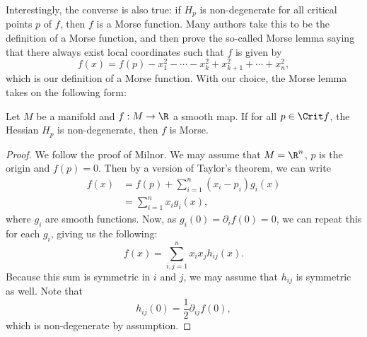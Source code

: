 Interestingly, the converse is also true: if $H_p$ is non-degenerate for all critical points  $p$ of $f$, then  $f$ is a Morse function.
Many authors take this to be the definition of a Morse function, and then prove the so-called Morse lemma saying that there always exist local coordinates such that $f$ is given by
\[
    f(x) = f(p) - x_1^2 - \cdots - x_k^2 + x_{k+1}^2 + \cdots + x_n^2
,\] 
which is our definition of a Morse function. 
With our choice, the Morse lemma takes on the following form:
\begin{lemma}
    Let $M$ be a manifold and $f: M \to  \R$ a smooth map.
    If for all $p \in \Crit f$, the Hessian $H_p$ is non-degenerate, then $f$ is Morse.
\end{lemma}
\begin{proof}
    We follow the proof of Milnor.
    We may assume that $M = \R^{n}$, $p$ is the origin and $f(p) = 0$.
    Then by a version of Taylor's theorem, we can write
    \begin{align*}
        f(x)  &= f(p) + \sum_{i=1}^{n} (x_i - p_i) g_i (x)\\
              &= \sum_{i=1}^{n} x_i g_i(x)
    ,\end{align*} 
    where $g_i$ are smooth functions. 
    Now, as $g_i(0) = \partial_i f (0) = 0$, we can repeat this for each  $g_i$, giving us the following:
    \[
        f(x) = \sum_{i, j= 1}^{n} x_i x_j h_{ij}(x)
    .\] 
    Because this sum is symmetric in $i$ and  $j$, we may assume that  $h_{ij}$ is symmetric as well.
    Note that
    \[
        h_{ij}(0) = \frac{1}{2} \partial_{ij} f(0)
    ,\]
    which is non-degenerate by assumption.


\end{proof}
